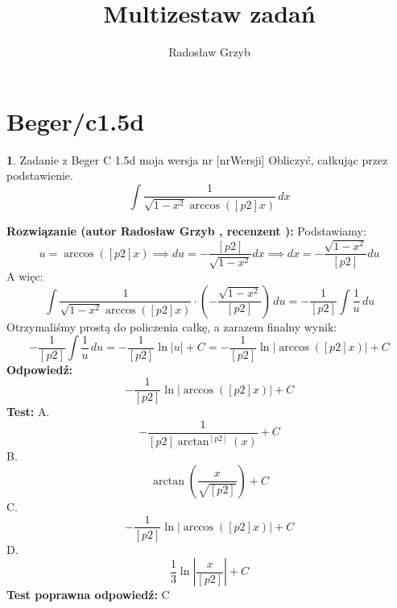 \documentclass[12pt, a4paper]{article}
\title{Multizestaw zadań}
\author{Radosław Grzyb}
\date{}
\theoremstyle{definition} %
\newtheorem{zad}{}
\newcommand{\kategoria}[1]{\section{#1}} %
\newcommand{\zadStart}[1]{\begin{zad}#1\newline} %
\newcommand{\zadStop}{\end{zad}}   %
\newcommand{\rozwStart}[2]{\noindent \textbf{Rozwiązanie (autor #1 , recenzent #2): }\newline} %
\newcommand{\rozwStop}{\newline}                                            %
\newcommand{\odpStart}{\noindent \textbf{Odpowiedź:}\newline}    %
\newcommand{\odpStop}{\newline}                                             %
\newcommand{\testStart}{\noindent \textbf{Test:}\newline} %
\newcommand{\testStop}{\newline} %
\newcommand{\kluczStart}{\noindent \textbf{Test poprawna odpowiedź:}\newline} %
\newcommand{\kluczStop}{\newline} %
\begin{document}
\maketitle
\kategoria{Beger/c1.5d}
\zadStart{Zadanie z Beger C 1.5d moja wersja nr [nrWersji]}
Obliczyć, całkując przez podstawienie.
$$\int \frac{1}{\sqrt{1-x^2}\arccos([p2]x)} \,dx$$
\zadStop
\rozwStart{Radosław Grzyb}{}
Podstawiamy:
$$u=\arccos([p2]x) \implies du=-\frac{[p2]}{\sqrt{1-x^2}}dx \implies dx=-\frac{\sqrt{1-x^2}}{[p2]}du$$
A więc:
$$\int \frac{1}{\sqrt{1-x^2}\arccos([p2]x)}\cdot\left(-\frac{\sqrt{1-x^2}}{[p2]}\right) \,du=-\frac{1}{[p2]}\int \frac{1}{u} \,du$$
Otrzymaliśmy prostą do policzenia całkę, a zarazem finalny wynik:
$$-\frac{1}{[p2]}\int \frac{1}{u} \,du=-\frac{1}{[p2]}\ln|u|+C=-\frac{1}{[p2]}\ln|\arccos([p2]x)|+C$$
\rozwStop
\odpStart
$$-\frac{1}{[p2]}\ln|\arccos([p2]x)|+C$$
\odpStop
\testStart
A.$$-\frac{1}{[p2]\arctan^{[p2]}(x)}+C$$
B.$$\arctan(\frac{x}{\sqrt{[p2]}})+C$$
C.$$-\frac{1}{[p2]}\ln|\arccos([p2]x)|+C$$
D.$$\frac{1}{3}\ln|\frac{x}{[p2]}|+C$$
\testStop
\kluczStart
C
\kluczStop
\end{document}
